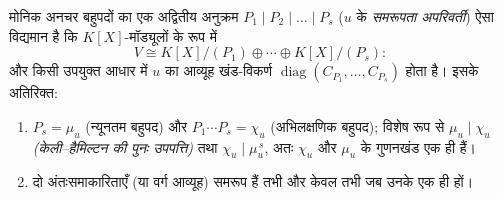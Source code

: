 \begin{theorem}[फ्रोबेनियस: परिमेय विहित रूप]
\label{thm:b3:modules:frobenius}
मोनिक अनचर बहुपदों का एक अद्वितीय अनुक्रम $P_1
\mid P_2 \mid \dots \mid P_s$ ($u$ के
\emph{समरूपता अपरिवर्ती}) ऐसा विद्यमान
है कि $K[X]$-मॉड्यूलों के रूप में
\[
V \cong K[X]/(P_1) \oplus \cdots \oplus K[X]/(P_s):
\]
और किसी उपयुक्त आधार में $u$ का आव्यूह खंड-विकर्ण $\operatorname{diag}(C_{P_1}, \dots, C_{P_s})$ होता
है। इसके अतिरिक्त:
\begin{enumerate}
  \item $P_s = \mu_u$ (न्यूनतम बहुपद) और $P_1\cdots P_s =
        \chi_u$ (अभिलक्षणिक बहुपद);
        विशेष रूप से $\mu_u
        \mid \chi_u$ \emph{(केली--हैमिल्टन की पुनः
        उपपत्ति)} तथा $\chi_u \mid \mu_u^{\,s}$, अतः $\chi_u$ और $\mu_u$ के 
        गुणनखंड एक ही हैं।
  \item दो अंतःसमाकारिताएँ (या वर्ग आव्यूह) समरूप हैं तभी और
        केवल तभी जब उनके  एक ही हों।
\end{enumerate}
\end{theorem}

